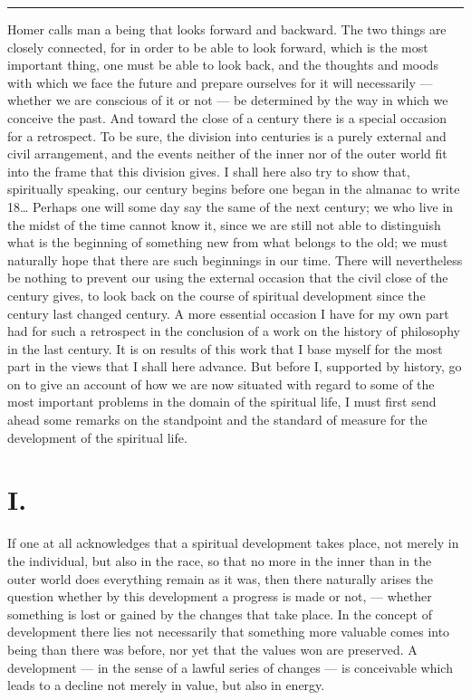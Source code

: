 \documentclass[12pt,a4paper,openany]{book}
\newcommand{\opage}[1]{\marginnote{\footnotesize\textit{[#1]}}}
\newcommand{\streg}{\begin{center}\rule{3em}{0.4pt}\end{center}}
\begin{document}
\streg{}

Homer calls man a being that looks forward and
backward. The two things are closely connected, for in order to be able to
look forward, which is the most important thing, one must be able to look
back, and the thoughts and moods with which we face
the future and prepare ourselves for it will necessarily --- whether
we are conscious of it or not --- be determined by
the way in which we conceive the past. And toward the
close of a century there is a special occasion for a
retrospect. To be sure, the division into centuries is a
purely external and civil arrangement, and the events neither of the inner
nor of the outer world fit into the frame
that this division gives. I shall here also try to show
that, spiritually speaking, our century begins before one
began in the almanac to write 18… Perhaps one will some
day say the same of the next century; we who
live in the midst of the time cannot know it, since we are still not able to
distinguish what is the beginning of something new from what
belongs to the old; we must naturally hope that there are
such beginnings in our time. There will nevertheless be
nothing to prevent our using the external occasion
that the civil close of the century gives, to look back on
the course of spiritual development since the century last changed
\opage{226}century. A more essential occasion I have for my own
part had for such a retrospect in the
conclusion of a work on the history of philosophy in the last
century. It is on results of this work that I base myself for
the most part in the views that I shall here
advance. But before I, supported by history, go on
to give an account of how we are now situated with regard
to some of the most important problems in the domain of the spiritual
life, I must first send ahead some remarks on the
standpoint and the standard of measure for the development of the spiritual life.

\section*{I.}

If one at all acknowledges that a spiritual development
takes place, not merely in the individual, but also
in the race, so that no more in the inner than in the outer
world does everything remain as it was, then there naturally arises the
question whether by this development a progress is made
or not, --- whether something is lost or gained by the changes
that take place. In the concept of development there lies not necessarily
that something more valuable comes into being than there was before, nor
yet that the values won are preserved. A
development --- in the sense of a lawful series of
changes --- is conceivable which leads to a decline not merely in value,
but also in energy.
\end{document}

